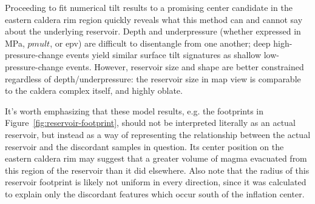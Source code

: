 Proceeding to fit numerical tilt results to a promising center candidate in the eastern caldera rim region quickly reveals what this method can and cannot say about the underlying reservoir. Depth and underpressure (whether expressed in \unit{\mega\Pa}, $pmult$, or \acs{epv}) are difficult to disentangle from one another; deep high-pressure-change events yield similar surface tilt signatures as shallow low-pressure-change events. However, reservoir size and shape are better constrained regardless of depth/underpressure: the reservoir size in map view is comparable to the caldera complex itself, and highly oblate. 

It's worth emphasizing that these model results, e.g. the footprints in Figure~\ref{fig:reservoir-footprint}, should not be interpreted literally as an actual reservoir, but instead as a way of representing the relationship between the actual reservoir and the discordant samples in question. Its center position on the eastern caldera rim may suggest that a greater volume of magma evacuated from this region of the reservoir than it did elsewhere. Also note that the radius of this reservoir footprint is likely not uniform in every direction, since it was calculated to explain only the discordant features which occur south of the inflation center.



